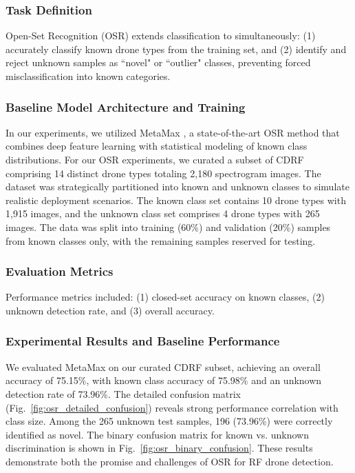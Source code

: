 \subsubsection{Task Definition}
Open-Set Recognition (OSR) extends classification to simultaneously: (1) accurately classify known drone types from the training set, and (2) identify and reject unknown samples as ``novel" or ``outlier" classes, preventing forced misclassification into known categories.

\subsubsection{Baseline Model Architecture and Training}
In our experiments, we utilized MetaMax \cite{lyu2023metamax}, a state-of-the-art OSR method that combines deep feature learning with statistical modeling of known class distributions. For our OSR experiments, we curated a subset of CDRF comprising 14 distinct drone types totaling 2,180 spectrogram images. The dataset was strategically partitioned into known and unknown classes to simulate realistic deployment scenarios. The known class set contains 10 drone types with 1,915 images, and the unknown class set comprises 4 drone types with 265 images. The data was split into training (60\%) and validation (20\%) samples from known classes only, with the remaining samples reserved for testing.

\subsubsection{Evaluation Metrics}
Performance metrics included: (1) closed-set accuracy on known classes, (2) unknown detection rate, and (3) overall accuracy.

\subsubsection{Experimental Results and Baseline Performance}
We evaluated MetaMax on our curated CDRF subset, achieving an overall accuracy of 75.15\%, with known class accuracy of 75.98\% and an unknown detection rate of 73.96\%. The detailed confusion matrix (Fig.~\ref{fig:osr_detailed_confusion}) reveals strong performance correlation with class size. Among the 265 unknown test samples, 196 (73.96\%) were correctly identified as novel. The binary confusion matrix for known vs. unknown discrimination is shown in Fig.~\ref{fig:osr_binary_confusion}. These results demonstrate both the promise and challenges of OSR for RF drone detection.

